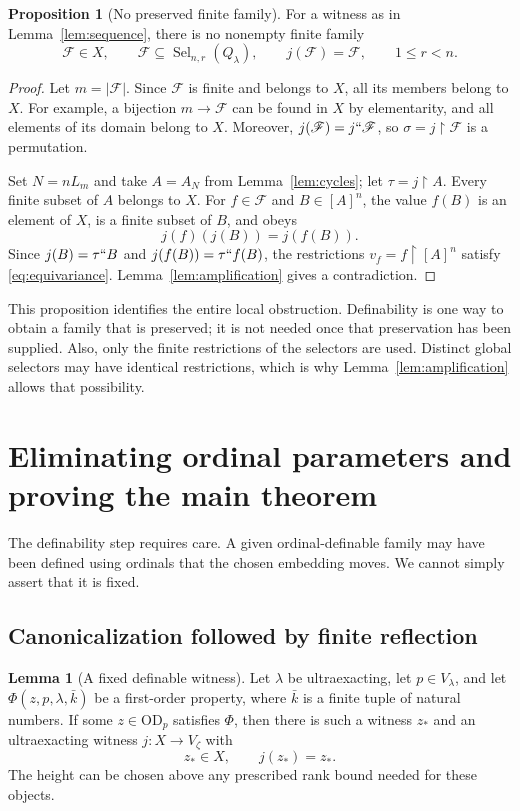 \documentclass[11pt,letterpaper]{article}
\theoremstyle{definition}
\newtheorem{proposition}[definition]{Proposition}
\newtheorem{lemma}[definition]{Lemma}
\newcommand{\OD}{\mathrm{OD}}
\newcommand{\restr}{\mathbin{\upharpoonright}}
\newcommand{\Sel}{\operatorname{Sel}}
\newcommand{\FF}{\mathscr F}
\begin{document}
\begin{proposition}[No preserved finite family]\label{prop:fixedfamily}
For a witness as in Lemma~\ref{lem:sequence}, there is no nonempty finite family
\[
 \FF\in X,\qquad \FF\subseteq\Sel_{n,r}(Q_\lambda),
 \qquad j(\FF)=\FF,
 \qquad 1\leq r<n.
\]
\end{proposition}

\begin{proof}
Let $m=|\FF|$. Since $\FF$ is finite and belongs to $X$, all its members belong to $X$. For example, a bijection $m\to\FF$ can be found in $X$ by elementarity, and all elements of its domain belong to $X$. Moreover, $j(\FF)=j``\FF$, so $\sigma=j\restr\FF$ is a permutation.

Set $N=nL_m$ and take $A=A_N$ from Lemma~\ref{lem:cycles}; let $\tau=j\restr A$. Every finite subset of $A$ belongs to $X$. For $f\in\FF$ and $B\in[A]^n$, the value $f(B)$ is an element of $X$, is a finite subset of $B$, and obeys
\[
 j(f)(j(B))=j(f(B)).
\]
Since $j(B)=\tau``B$ and $j(f(B))=\tau``f(B)$, the restrictions $v_f=f\restr[A]^n$ satisfy \eqref{eq:equivariance}. Lemma~\ref{lem:amplification} gives a contradiction.
\end{proof}

This proposition identifies the entire local obstruction. Definability is one way to obtain a family that is preserved; it is not needed once that preservation has been supplied. Also, only the finite restrictions of the selectors are used. Distinct global selectors may have identical restrictions, which is why Lemma~\ref{lem:amplification} allows that possibility.

\section{Eliminating ordinal parameters and proving the main theorem}\label{sec:main}

The definability step requires care. A given ordinal-definable family may have been defined using ordinals that the chosen embedding moves. We cannot simply assert that it is fixed.

\subsection{Canonicalization followed by finite reflection}

\begin{lemma}[A fixed definable witness]\label{lem:canonical}
Let $\lambda$ be ultraexacting, let $p\in V_\lambda$, and let $\Phi(z,p,\lambda,\bar k)$ be a first-order property, where $\bar k$ is a finite tuple of natural numbers. If some $z\in\OD_p$ satisfies $\Phi$, then there is such a witness $z_*$ and an ultraexacting witness $j:X\to V_\zeta$ with
\[
 z_*\in X,\qquad j(z_*)=z_*.
\]
The height can be chosen above any prescribed rank bound needed for these objects.
\end{lemma}
\end{document}
